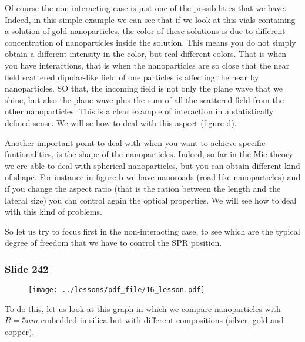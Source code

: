 \documentclass[../main/main.tex]{subfiles}
\begin{document}
Of course the non-interacting case is just one of the possibilities that we have. Indeed, in this simple example we can see that if we look at this vials containing a solution of gold nanoparticles, the color of these solutions is due to different concentration of nanoparticles inside the solution.
This means you do not simply obtain a different intensity in the color, but real different colors. That is when you have interactions, that is when the nanoparticles are so close that the near field scattered dipolar-like field of one particles is affecting the near by nanoparticles. SO that, the incoming field is not only the plane wave that we shine, but also the plane wave plus the sum of all the scattered field from the other nanoparticles.
This is a clear example of interaction in a statistically defined sense. We will se how to deal with this aspect (figure d).


Another important point to deal with when you want to achieve specific funtionalities, is the shape of the nanoparticles.
Indeed, so far in the Mie theory we ere able to deal with spherical nanoparticles, but you can obtain different kind of shape. For instance in figure b we have nanoroads (road like nanoparticles) and if you change the aspect ratio (that is the ration between the length and the lateral size) you can control again the optical properties.
We will see how to deal with this kind of problems.


So let us try to focus first in the non-interacting case, to see which are the typical degree of freedom that we have to control the SPR position.

\newpage

\subsubsection{Slide 242}

\begin{figure}[h!]
\centering
\texttt{[image: ../lessons/pdf\_file/16\_lesson.pdf]}
\end{figure}

To do this, let us look at this graph in which we compare nanoparticles with \( R=5nm \) embedded in silica but with different compositions (silver, gold and copper).
\end{document}
